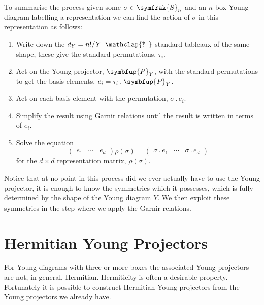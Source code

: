 \documentclass[fleqn]{NotesClass}
\newcommand{\symmetricGroup}[1][n]{\symfrak{S}_{#1}}
\newcommand{\action}{\mathbin{.}}
\newcommand{\projector}[1]{\symbfup{P}_{#1}}
\newcommand{\hooknumber}[1]{#1{\phantom{?}\mkern1mu\mathclap{\ooalign{\hfil ? \hfil \cr \hfil ! \hfil}}}}
\renewcommand{\ve}[1]{e_{#1}}
\begin{document}
    To summarise the process given some \(\sigma \in \symmetricGroup\) and an \(n\) box Young diagram labelling a representation we can find the action of \(\sigma\) in this representation as follows:
    \begin{enumerate}
        \item Write down the \(d_Y = n!/\hooknumber{Y}\) standard tableaux of the same shape, these give the standard permutations, \(\tau_i\).
        \item Act on the Young projector, \(\projector{Y}\), with the standard permutations to get the basis elements, \(\ve{i} = \tau_i \action \projector{Y}\).
        \item Act on each basis element with the permutation, \(\sigma \action \ve{i}\).
        \item Simplify the result using Garnir relations until the result is written in terms of \(\ve{i}\).
        \item Solve the equation
        \begin{equation}
            \begin{pmatrix}
                \ve{1} & \cdots & \ve{d}
            \end{pmatrix}
            \rho(\sigma) = 
            \begin{pmatrix}
                \sigma \action \ve{1} & \cdots & \sigma \action \ve{d}
            \end{pmatrix}
        \end{equation}
        for the \(d \times d\) representation matrix, \(\rho(\sigma)\).
    \end{enumerate}
    
    Notice that at no point in this process did we ever actually have to use the Young projector, it is enough to know the symmetries which it possesses, which is fully determined by the shape of the Young diagram \(Y\).
    We then exploit these symmetries in the step where we apply the Garnir relations.
    
    \section{Hermitian Young Projectors}
    For Young diagrams with three or more boxes the associated Young projectors are not, in general, Hermitian.
    Hermiticity is often a desirable property.
    Fortunately it is possible to construct Hermitian Young projectors from the Young projectors we already have.
    
\end{document}
